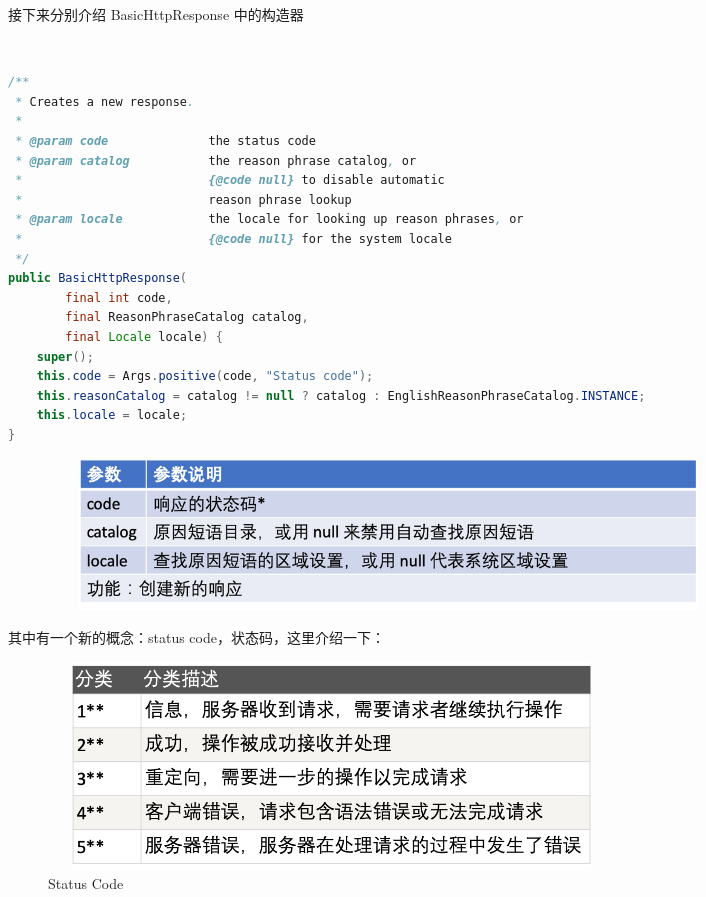 \documentclass{article}
\begin{document}
	\begin{CJK}{UTF8}{gbsn}
		接下来分别介绍 BasicHttpResponse 中的构造器
	\end{CJK}{}

	\hspace*{\fill} \\ %

	\begin{lstlisting}[language={java}]
/**
 * Creates a new response.
 *
 * @param code              the status code
 * @param catalog           the reason phrase catalog, or
 *                          {@code null} to disable automatic
 *                          reason phrase lookup
 * @param locale            the locale for looking up reason phrases, or
 *                          {@code null} for the system locale
 */
public BasicHttpResponse(
        final int code,
        final ReasonPhraseCatalog catalog,
        final Locale locale) {
    super();
    this.code = Args.positive(code, "Status code");
    this.reasonCatalog = catalog != null ? catalog : EnglishReasonPhraseCatalog.INSTANCE;
    this.locale = locale;
}
	\end{lstlisting}

	\begin{figure}[H]
		\centering
		\includegraphics[height = 4cm, width = 18cm]{pics/23_Response_table_1.png}	
	\end{figure}

	\begin{CJK}{UTF8}{gbsn}
		其中有一个新的概念：status code，状态码，这里介绍一下：
	\end{CJK}{}

	\begin{figure}[H]
		\centering
		\includegraphics[height = 5.5cm, width = 15cm]{pics/24_status_code.png}	
		\caption{Status Code}
	\end{figure}
\end{document}
